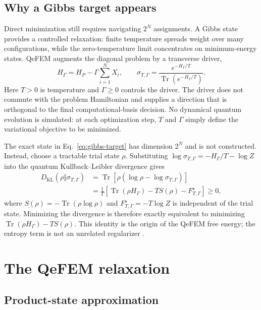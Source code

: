 \documentclass[
  aps,
  prx,
  reprint,
  amsmath,
  amssymb,
  groupedaddress,
  nofootinbib,
  floatfix,
  longbibliography
]{revtex4-2}
\newcommand{\qefem}{QeFEM}
\newcommand{\Tr}{\operatorname{Tr}}
\newcommand{\Dkl}{D_{\mathrm{KL}}}
\begin{document}
\subsection{Why a Gibbs target appears}

Direct minimization still requires navigating $2^N$ assignments.  A Gibbs
state provides a controlled relaxation: finite temperature spreads weight
over many configurations, while the zero-temperature limit concentrates on
minimum-energy states.  \qefem{} augments the diagonal problem by a transverse
driver,
\begin{equation}
 H_{\Gamma}=H_P-\Gamma\sum_{i=1}^{N}X_i,
 \qquad
 \sigma_{T,\Gamma}=\frac{e^{-H_{\Gamma}/T}}
 {\Tr(e^{-H_{\Gamma}/T})}.
 \label{eq:gibbs-target}
\end{equation}
Here $T>0$ is temperature and $\Gamma\geq0$ controls the driver.  The driver
does not commute with the problem Hamiltonian and supplies a direction that is
orthogonal to the final computational-basis decision.  No dynamical quantum
evolution is simulated: at each optimization step, $T$ and $\Gamma$ simply
define the variational objective to be minimized.

The exact state in Eq.~\eqref{eq:gibbs-target} has dimension $2^N$ and is not
constructed.  Instead, choose a tractable trial state $\rho$.  Substituting
$\log\sigma_{T,\Gamma}=-H_{\Gamma}/T-\log Z$ into the quantum
Kullback--Leibler divergence gives
\begin{equation}
 \begin{aligned}
  \Dkl(\rho\Vert\sigma_{T,\Gamma})
  &=\Tr\!\left[\rho(\log\rho-\log\sigma_{T,\Gamma})\right]\\
  &=\frac{1}{T}\left[
      \Tr(\rho H_{\Gamma})-T S(\rho)-F^{\star}_{T,\Gamma}
    \right]\geq0,
 \end{aligned}
 \label{eq:kl-free-energy}
\end{equation}
where $S(\rho)=-\Tr(\rho\log\rho)$ and
$F^{\star}_{T,\Gamma}=-T\log Z$ is independent of the trial state.  Minimizing
the divergence is therefore exactly equivalent to minimizing
$\Tr(\rho H_{\Gamma})-TS(\rho)$.  This identity is the origin of the \qefem{}
free energy; the entropy term is not an unrelated regularizer
\cite{wainwright2008,blei2017,nielsen2010}.

\section{The QeFEM relaxation}
\label{sec:method}

\subsection{Product-state approximation}
\end{document}
